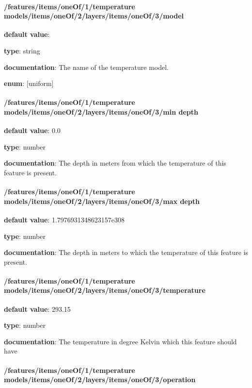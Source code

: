 \paragraph{/features/items/oneOf/1/temperature models/items/oneOf/2/layers/items/oneOf/3/model} \begin{itemized}
\item {\bf default value}: 
\item {\bf type}: string
\item {\bf documentation}: The name of the temperature model.
\item {\bf enum}: [uniform]\end{itemized}\paragraph{/features/items/oneOf/1/temperature models/items/oneOf/2/layers/items/oneOf/3/min depth} \begin{itemized}
\item {\bf default value}: 0.0
\item {\bf type}: number
\item {\bf documentation}: The depth in meters from which the temperature of this feature is present.
\end{itemized}\paragraph{/features/items/oneOf/1/temperature models/items/oneOf/2/layers/items/oneOf/3/max depth} \begin{itemized}
\item {\bf default value}: 1.7976931348623157e308
\item {\bf type}: number
\item {\bf documentation}: The depth in meters to which the temperature of this feature is present.
\end{itemized}\paragraph{/features/items/oneOf/1/temperature models/items/oneOf/2/layers/items/oneOf/3/temperature} \begin{itemized}
\item {\bf default value}: 293.15
\item {\bf type}: number
\item {\bf documentation}: The temperature in degree Kelvin which this feature should have
\end{itemized}\paragraph{/features/items/oneOf/1/temperature models/items/oneOf/2/layers/items/oneOf/3/operation} \begin{itemized}

\end{itemized}
